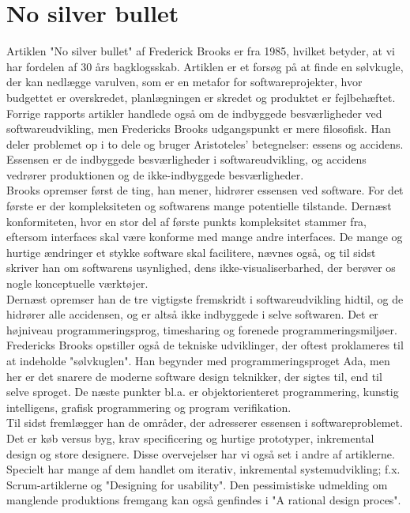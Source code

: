 \documentclass[12pt]{article}   %
\begin{document}
\section{No silver bullet}
Artiklen "No silver bullet" af Frederick Brooks er fra 1985, hvilket betyder, at vi har fordelen af 30 års bagklogsskab. Artiklen er et forsøg på at finde en sølvkugle, der kan nedlægge varulven, som er en metafor for softwareprojekter, hvor budgettet er overskredet, planlægningen er skredet og produktet er fejlbehæftet. Forrige rapports artikler handlede også om de indbyggede besværligheder ved softwareudvikling, men Fredericks Brooks udgangspunkt er mere filosofisk. Han deler problemet op i to dele og bruger Aristoteles' betegnelser: essens og accidens. Essensen er de indbyggede besværligheder i softwareudvikling, og accidens vedrører produktionen og de ikke-indbyggede besværligheder. \\
Brooks opremser først de ting, han mener, hidrører essensen ved software. For det første er der kompleksiteten og softwarens mange potentielle tilstande. Dernæst konformiteten, hvor en stor del af første punkts kompleksitet stammer fra, eftersom interfaces skal være konforme med mange andre interfaces. De mange og hurtige ændringer et stykke software skal facilitere, nævnes også, og til sidst skriver han om softwarens usynlighed, dens ikke-visualiserbarhed, der berøver os nogle konceptuelle værktøjer. \\
Dernæst opremser han de tre vigtigste fremskridt i softwareudvikling hidtil, og de hidrører alle accidensen, og er altså ikke indbyggede i selve softwaren. Det er højniveau programmeringsprog, timesharing og forenede programmeringsmiljøer. \\
Fredericks Brooks opstiller også de tekniske udviklinger, der oftest proklameres til at indeholde "sølvkuglen". Han begynder med programmeringsproget Ada, men her er det snarere de moderne software design teknikker, der sigtes til, end til selve sproget. De næste punkter bl.a. er objektorienteret programmering, kunstig intelligens, grafisk programmering og program verifikation. \\
Til sidst fremlægger han de områder, der adresserer essensen i softwareproblemet. Det er køb versus byg, krav specificering og hurtige prototyper, inkremental design og store designere. Disse overvejelser har vi også set i andre af artiklerne. Specielt har mange af dem handlet om iterativ, inkremental systemudvikling; f.x. Scrum-artiklerne og "Designing for usability". Den pessimistiske udmelding om manglende produktions fremgang kan også genfindes i "A rational design proces".
\end{document}
